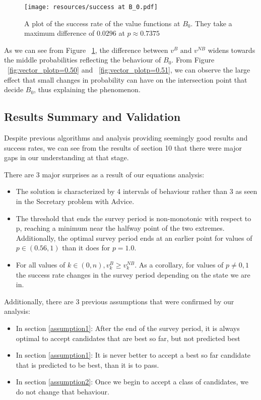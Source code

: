 \documentclass[a4paper,11pt]{article}
\begin{document}
\begin{figure}[H]
    \centering
    \texttt{[image: resources/success at B\_0.pdf]}
    \caption{A plot of the success rate of the value functions at $B_0$. They take a maximum difference of $0.0296$ at $p \approx 0.7375$}
    \label{fig:success at B_0}
\end{figure}

As we can see from Figure ~\ref{fig:success at B_0}, the difference between $v^B \text{ and } v^{NB}$ widens towards the middle probabilities reflecting the behaviour of $B_0$. From Figure ~\ref{fig:vector_plotp=0.50} and ~\ref{fig:vector_plotp=0.51}, we can observe the large effect that small changes in probability can have on the intersection point that decide $B_0$, thus explaining the phenomenon.

\subsection{Results Summary and Validation}
Despite previous algorithms and analysis providing seemingly good results and success rates, we can see from the results of section 10 that there were major gaps in our understanding at that stage. 

There are 3 major surprises as a result of our equations analysis:

\begin{itemize}
    \item The solution is characterized by 4 intervals of behaviour rather than 3 as seen in the Secretary problem with Advice.
    \item The threshold that ends the survey period is non-monotonic with respect to p, reaching a minimum near the halfway point of the two extremes. Additionally, the optimal survey period ends at an earlier point for values of $p \in (0.56,1)$ than it does for $p=1.0$.
    \item For all values of $k \in (0,n), v^B_k\ge v^{NB}_k$. As a corollary, for values of $p \ne 0, 1$ the success rate changes in the survey period depending on the state we are in.
\end{itemize}

Additionally, there are 3 previous assumptions that were confirmed by our analysis:

\begin{itemize}
    \item In section \ref{assumption1}: After the end of the survey period, it is always optimal to accept candidates that are best so far, but not predicted best
    \item In section \ref{assumption1}: It is never better to accept a best so far candidate that is predicted to be best, than it is to pass.
    \item In section \ref{assumption2}: Once we begin to accept a class of candidates, we do not change that behaviour.
\end{itemize}
\end{document}
